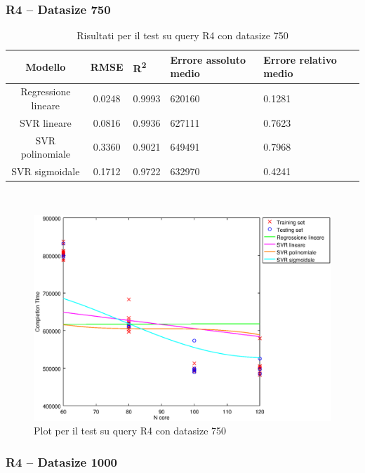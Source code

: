 \documentclass[a4paper,11pt]{article}
\begin{document}
\subsubsection{R4 -- Datasize 750}
\begin{table}[bhpt]
	\centering
	\begin{adjustbox}{center}
		\begin{tabular}{c | c M{1.2cm} M{2.5cm} M{2.5cm} M{1.8cm}}
			Modello & RMSE & R\textsuperscript{2} & Errore assoluto medio & Errore relativo medio \tabularnewline
			\hline
			Regressione lineare & 0.0248 & 0.9993 & 620160 & 0.1281 \\
			SVR lineare & 0.0816 & 0.9936 & 627111 & 0.7623 \\
			SVR polinomiale & 0.3360 & 0.9021 & 649491 & 0.7968 \\
			SVR sigmoidale & 0.1712 & 0.9722 & 632970 & 0.4241 \\
		\end{tabular}
	\end{adjustbox}
	\\
	\caption{Risultati per il test su query R4 con datasize 750}
	\label{table_R4_750}
\end{table}

\begin {figure}[hbtp]
\centering
\includegraphics[width=\textwidth]{output/R4_750/plot_R4_750.eps}
\caption {Plot per il test su query R4 con datasize 750}
\end {figure}
\newpage
\subsubsection{R4 -- Datasize 1000}
\end{document}
